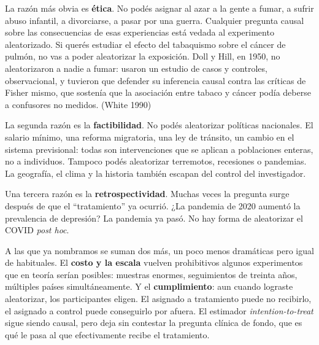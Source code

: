 \documentclass[
  letterpaper,
  DIV=11,
  numbers=noendperiod,
  oneside]{scrreprt}
\begin{document}
La razón más obvia es \textbf{ética}. No podés asignar al azar a la
gente a fumar, a sufrir abuso infantil, a divorciarse, a pasar por una
guerra. Cualquier pregunta causal sobre las consecuencias de esas
experiencias está vedada al experimento aleatorizado. Si querés estudiar
el efecto del tabaquismo sobre el cáncer de pulmón, no vas a poder
aleatorizar la exposición. Doll y Hill, en 1950, no aleatorizaron a
nadie a fumar: usaron un estudio de casos y controles, observacional, y
tuvieron que defender su inferencia causal contra las críticas de Fisher
mismo, que sostenía que la asociación entre tabaco y cáncer podía
deberse a confusores no medidos. (White
1990)

La segunda razón es la \textbf{factibilidad}. No podés aleatorizar
políticas nacionales. El salario mínimo, una reforma migratoria, una ley
de tránsito, un cambio en el sistema previsional: todas son
intervenciones que se aplican a poblaciones enteras, no a individuos.
Tampoco podés aleatorizar terremotos, recesiones o pandemias. La
geografía, el clima y la historia también escapan del control del
investigador.

Una tercera razón es la \textbf{retrospectividad}. Muchas veces la
pregunta surge después de que el ``tratamiento'' ya ocurrió. ¿La
pandemia de 2020 aumentó la prevalencia de depresión? La pandemia ya
pasó. No hay forma de aleatorizar el COVID \emph{post hoc}.

A las que ya nombramos se suman dos más, un poco menos dramáticas pero
igual de habituales. El \textbf{costo y la escala} vuelven prohibitivos
algunos experimentos que en teoría serían posibles: muestras enormes,
seguimientos de treinta años, múltiples países simultáneamente. Y el
\textbf{cumplimiento}: aun cuando lograste aleatorizar, los
participantes eligen. El asignado a tratamiento puede no recibirlo, el
asignado a control puede conseguirlo por afuera. El estimador
\emph{intention-to-treat} sigue siendo causal, pero deja sin contestar
la pregunta clínica de fondo, que es qué le pasa al que efectivamente
recibe el tratamiento.
\end{document}
